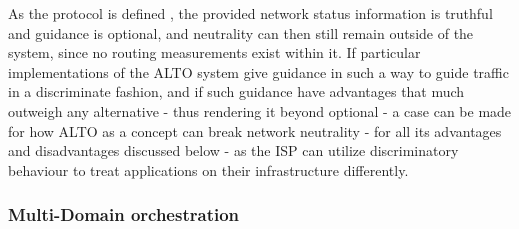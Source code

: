     As the protocol is defined \cite{alto-protocol}, the provided network status information is truthful and guidance is optional, and neutrality can then still remain outside of the system, since no routing measurements exist within it.
    If particular implementations of the ALTO system give guidance in such a way to guide traffic in a discriminate fashion, and if such guidance have advantages that much outweigh any alternative - thus rendering it beyond optional - a case can be made for how ALTO as a concept can break network neutrality - for all its advantages and disadvantages discussed below - as the ISP can utilize discriminatory behaviour to treat applications on their infrastructure differently.

\subsubsection{Multi-Domain orchestration}

